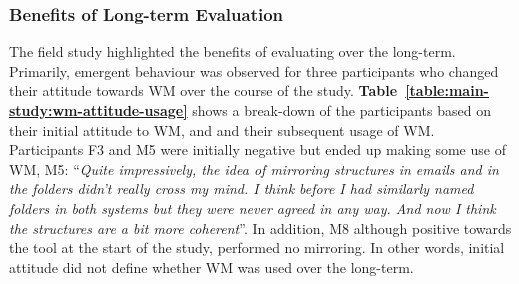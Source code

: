 
\subsubsection{Benefits of Long-term Evaluation}

The field study highlighted the benefits of evaluating over the long-term.  Primarily, emergent behaviour was observed for three participants who changed their attitude towards WM over the course of the study.   \textbf{Table~\ref{table:main-study:wm-attitude-usage}} shows a break-down of the participants based on their initial attitude to WM, and and their subsequent usage of WM.
Participants F3 and M5 were initially negative but ended up making some use of WM, M5: ``\textit{Quite impressively, the idea of mirroring structures in emails and in the folders didn't really cross my mind. I think before I had similarly named folders in both systems but they were never agreed in any way. And now I think the structures are a bit more coherent}''.  In addition, M8 although positive towards the tool at the start of the study, performed no mirroring. In other words, initial attitude did not define whether WM was used over the long-term.


